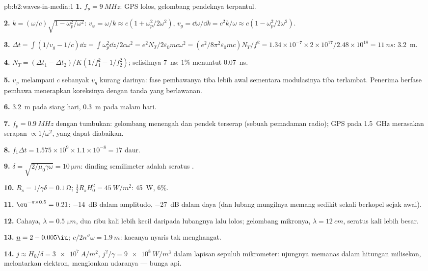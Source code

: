 \begin{solution}{pb:b2:waves-in-media:1}
\textbf{1.} $f_p = \qty{9}{MHz}$: GPS lolos, gelombang pendeknya terpantul.

\textbf{2.} $k = (\omega/c)\sqrt{1 - \omega_p^2/\omega^2}$: $v_\varphi = \omega/k \approx c(1 + \omega_p^2/
2\omega^2)$, $v_g = \dd\omega/\dd k = c^2k/\omega \approx c(1 - \omega_p^2/2\omega^2)$.

\textbf{3.} $\Delta t = \int(1/v_g - 1/c)\dd z = \int\omega_p^2\dd z/2c\omega^2 = e^2N_T/2\varepsilon_0
mc\omega^2 = (e^2/8\pi^2\varepsilon_0mc)N_T/f^2 = 1.34 \times 10^{-7} \times 2 \times 10^{17}/2.48 \times
10^{18} = \qty{11}{ns}$: \qty{3.2}{m}.

\textbf{4.} $N_T = (\Delta t_1 - \Delta t_2)/K(1/f_1^2 - 1/f_2^2)$; selisihnya
\qty{7}{ns}: $1\%$ menuntut \qty{0.07}{ns}.

\textbf{5.} $v_\varphi$ melampaui $c$ sebanyak $v_g$ kurang darinya: fase
pembawanya tiba lebih awal sementara modulasinya tiba terlambat. Penerima
berfase pembawa menerapkan koreksinya dengan tanda yang berlawanan.

\textbf{6.} \qty{3.2}{m} pada siang hari, \qty{0.3}{m} pada malam hari.

\textbf{7.} $f_p = \qty{0.9}{MHz}$ dengan tumbukan: gelombang menengah dan pendek
terserap (sebuah pemadaman radio); GPS pada \qty{1.5}{GHz} merasakan serapan
$\propto 1/\omega^2$, yang dapat diabaikan.

\textbf{8.} $f_1\Delta t = 1.575 \times 10^9 \times 1.1 \times 10^{-8} = 17$ daur.

\textbf{9.} $\delta = \sqrt{2/\mu_0\gamma\omega} = \qty{10}{\micro m}$: dinding semilimeter adalah
seratus .

\textbf{10.} $R_s = 1/\gamma\delta = \qty{0.1}{\ohm}$; $\tfrac12R_sH_0^2 = \qty{45}{W/m^2}$: \qty{45}{W},
$6\%$.

\textbf{11.} $\eu^{-\pi \times 0.5} = 0.21$: \qty{-14}{dB} dalam amplitudo, \qty{-27}{dB} dalam
daya (dan lubang mungilnya memang sedikit sekali berkopel sejak awal).

\textbf{12.} Cahaya, $\lambda = \qty{0.5}{\micro m}$, dua ribu kali lebih kecil
daripada lubangnya lalu lolos; gelombang mikronya, $\lambda = \qty{12}{cm}$,
seratus kali lebih besar.

\textbf{13.} $\underline n = 2 - 0.005\iu$; $c/2n''\omega = \qty{1.9}{m}$: kacanya
nyaris tak menghangat.

\textbf{14.} $j \approx H_0/\delta = \qty{3e7}{A/m^2}$, $j^2/\gamma = \qty{9e8}{W/m^3}$ dalam
lapisan sepuluh mikrometer: ujungnya memanas dalam hitungan milisekon, melontarkan elektron,
mengionkan udaranya --- bunga api.


\end{solution}
